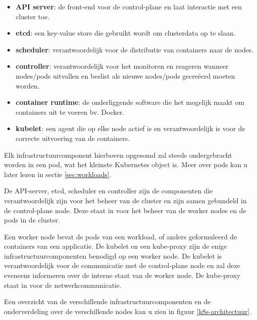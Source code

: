 \begin{itemize}
    \item {\bf API server}: de front-end voor de control-plane en laat interactie met een cluster toe. 
    \item {\bf etcd}: een key-value store die gebruikt wordt om clusterdata op te slaan. 
    \item {\bf scheduler}: verantwoordelijk voor de distributie van containers naar de nodes.
    \item {\bf controller}: verantwoordelijk voor het monitoren en reageren wanneer nodes/pods uitvallen en beslist als nieuwe nodes/pods gecreëerd moeten worden.
    \item {\bf container runtime}: de onderliggende software die het mogelijk maakt om containers uit te voeren bv. Docker. 
    \item {\bf kubelet}: een agent die op elke node actief is en verantwoordelijk is voor de correcte uitvoering van de containers.   
\end{itemize}

Elk infrastructuurcomponent hierboven opgesomd zal steeds ondergebracht worden in een pod, wat het kleinste Kubernetes object is. Meer over pods kan u later lezen in sectie \ref{sec:workloads}.

De API-server, etcd, scheduler en controller zijn de componenten die verantwoordelijk zijn voor het beheer van de cluster en zijn samen gebundeld in de control-plane node. Deze staat in voor het beheer van de worker nodes en de pods in de cluster.

Een worker node bevat de pods van een workload, of anders geformuleerd de containers van een applicatie. De kubelet en een kube-proxy zijn de enige infrastructuurcomponenten benodigd op een worker node. De kubelet is verantwoordelijk voor de communicatie met de control-plane node en zal deze eveneens informeren over de interne staat van de worker node. De kube-proxy staat in voor de netwerkcommunicatie. 

Een overzicht van de verschillende infrastructuurcomponenten en de onderverdeling over de verschillende nodes kan u zien in figuur \ref{k8s-architectuur}. 

